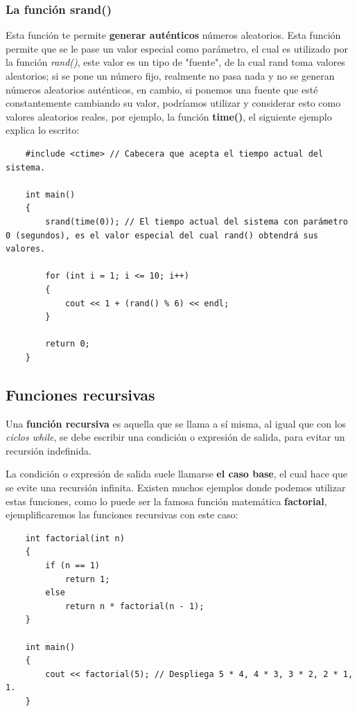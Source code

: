 \subsubsection{La función srand()}
\hspace{0.55cm}Esta función te permite \textbf{generar auténticos} números aleatorios. Esta función permite que se le pase un valor especial como parámetro, el cual es utilizado por la función \textit{rand()}, este valor es un tipo de "fuente", de la cual rand toma valores aleatorios; si se pone un número fijo, realmente no pasa nada y no se generan números aleatorios auténticos, en cambio, si ponemos una fuente que esté constantemente cambiando su valor, podríamos utilizar y considerar esto como valores aleatorios reales, por ejemplo, la función \textbf{time()}, el siguiente ejemplo explica lo escrito:
\begin{lstlisting}
    #include <ctime> // Cabecera que acepta el tiempo actual del sistema.

    int main()
    {
        srand(time(0)); // El tiempo actual del sistema con parámetro 0 (segundos), es el valor especial del cual rand() obtendrá sus valores.
        
        for (int i = 1; i <= 10; i++)
        {
            cout << 1 + (rand() % 6) << endl;
        }
        
        return 0;
    }
\end{lstlisting}


\subsection{Funciones recursivas}
\hspace{0.55cm}Una \textbf{función recursiva} es aquella que se llama a sí misma, al igual que con los \textit{ciclos while}, se debe escribir una condición o expresión de salida, para evitar un recursión indefinida.

La condición o expresión de salida suele llamarse \textbf{el caso base}, el cual hace que se evite una recursión infinita. Existen muchos ejemplos donde podemos utilizar estas funciones, como lo puede ser la famosa función matemática \textbf{factorial}, ejemplificaremos las funciones recursivas con este caso:
\begin{lstlisting}
    int factorial(int n)
    {
        if (n == 1)
            return 1;
        else
            return n * factorial(n - 1);
    }
    
    int main()
    {
        cout << factorial(5); // Despliega 5 * 4, 4 * 3, 3 * 2, 2 * 1, 1.
    }
\end{lstlisting}



